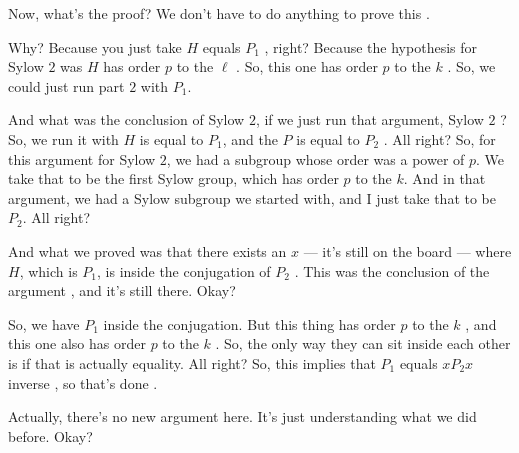 \begin{speech}[00:37:26 - 00:39:23]
Now, what's the proof? We don't have to do anything to prove this .

Why? Because you just take $H$ equals $P_1$ , right? Because the hypothesis for Sylow $2$ was $H$ has order $p$ to the $\ell$ . So, this one has order $p$ to the $k$ . So, we could just run part $2$ with $P_1$.

And what was the conclusion of Sylow $2$, if we just run that argument, Sylow $2$ ? So, we run it with $H$ is equal to $P_1$, and the $P$ is equal to $P_2$ . All right? So, for this argument for Sylow $2$, we had a subgroup whose order was a power of $p$. We take that to be the first Sylow group, which has order $p$ to the $k$. And in that argument, we had a Sylow subgroup we started with, and I just take that to be $P_2$. All right?

And what we proved was that there exists an $x$ --- it's still on the board  --- where $H$, which is $P_1$, is inside the conjugation of $P_2$ . This was the conclusion of the argument , and it's still there. Okay?

So, we have $P_1$ inside the conjugation. But this thing has order $p$ to the $k$ , and this one also has order $p$ to the $k$ . So, the only way they can sit inside each other is if that is actually equality. All right? So, this implies that $P_1$ equals $x P_2 x$ inverse , so that's done .

Actually, there's no new argument here. It's just understanding what we did before. Okay?
\end{speech}

